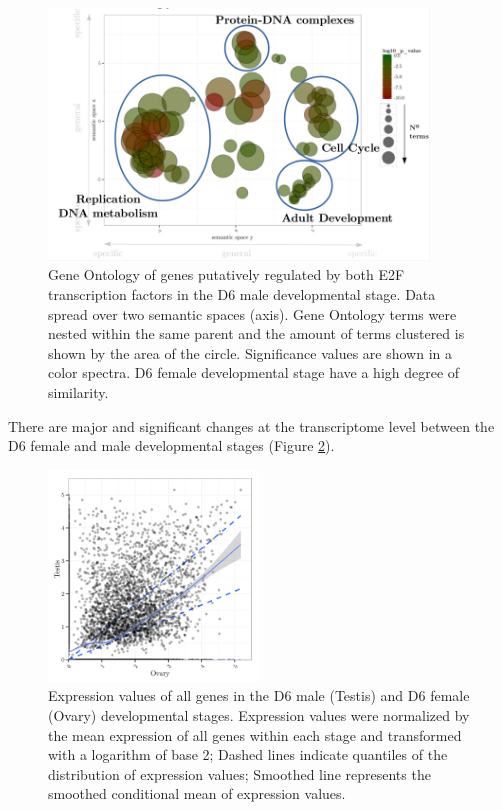 \documentclass[11pt,twoside,a4paper]{report}
\begin{document}
		\begin{figure}[here]
			\centering
			\includegraphics[width=0.9\textwidth]{pngs/E2F_overlap_overlaps_GO.png}
			\caption{Gene Ontology of genes putatively regulated by both E2F transcription factors in the D6 male developmental stage.
				{\footnotesize 
					Data spread over two semantic spaces (axis).
					Gene Ontology terms were nested within the same parent and the amount of terms clustered is shown by the area of the circle.
					Significance values are shown in a color spectra.
					D6 female developmental stage have a high degree of similarity.
				}
			}
			\label{fig:GO}
		\end{figure}

    	There are major and significant changes at the transcriptome level between the D6 female and male developmental stages (Figure \ref{fig:D6_expression}).
		
		\begin{figure}[here]
			\centering
			\includegraphics[width=0.5\textwidth]{pngs/D6_expression.png}
			\caption{Expression values of all genes in the D6 male (Testis) and D6 female (Ovary) developmental stages.
			{\footnotesize
				Expression values were normalized by the mean expression of all genes within each stage and transformed with a logarithm of base 2;
				Dashed lines indicate quantiles of the distribution of expression values;
				Smoothed line represents the smoothed conditional mean of expression values.
				}
			}
			\label{fig:D6_expression}
		\end{figure}
\end{document}
